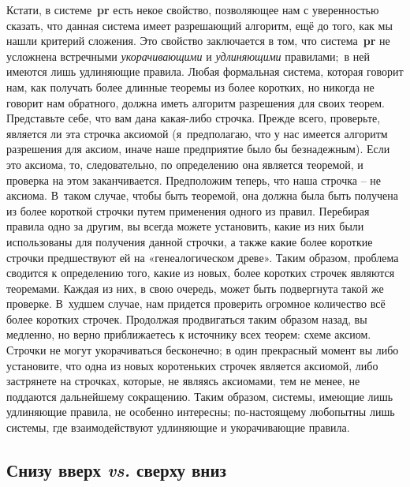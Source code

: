 \documentclass[../main.tex]{subfiles}
\begin{document}
Кстати, в системе~\textbf{pr} есть некое свойство, позволяющее нам с уверенностью сказать, что данная система имеет разрешающий алгоритм, ещё до того, как мы нашли критерий сложения. Это свойство заключается в том, что система~\textbf{pr} не усложнена встречными \emph{укорачивающими} и \emph{удлиняющими} правилами;~в ней имеются лишь удлиняющие правила. Любая формальная система, которая говорит нам, как получать более длинные теоремы из более коротких, но никогда не говорит нам обратного, должна иметь алгоритм разрешения для своих теорем. Представьте себе, что вам дана какая-либо строчка. Прежде всего, проверьте, является ли эта строчка аксиомой (я~предполагаю, что у нас имеется алгоритм разрешения для аксиом, иначе наше предприятие было бы безнадежным). Если это аксиома, то, следовательно, по определению она является теоремой, и проверка на этом заканчивается. Предположим теперь, что наша строчка \--- не аксиома. В~таком случае, чтобы быть теоремой, она должна была быть получена из более короткой строчки путем применения одного из правил. Перебирая правила одно за другим, вы всегда можете установить, какие из них были использованы для получения данной строчки, а также какие более короткие строчки предшествуют ей на «генеалогическом древе». Таким образом, проблема сводится к определению того, какие из новых, более коротких строчек являются теоремами. Каждая из них, в свою очередь, может быть подвергнута такой же проверке. В~худшем случае, нам придется проверить огромное количество всё более коротких строчек. Продолжая продвигаться таким образом назад, вы медленно, но верно приближаетесь к источнику всех теорем: схеме аксиом. Строчки не могут укорачиваться бесконечно; в один прекрасный момент вы либо установите, что одна из новых коротеньких строчек является аксиомой, либо застрянете на строчках, которые, не являясь аксиомами, тем не менее, не поддаются дальнейшему сокращению. Таким образом, системы, имеющие лишь удлиняющие правила, не особенно интересны; по-настоящему любопытны лишь системы, где взаимодействуют удлиняющие и укорачивающие правила.


\subsection{Снизу вверх \emph{vs.} сверху вниз}
\end{document}
